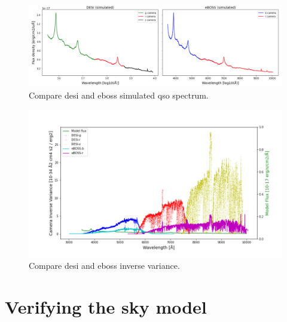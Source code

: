 
\begin{figure}[h]
\centering
\includegraphics[width=16cm]{images/specsim/sim_comparison.png}
\caption{Compare desi and eboss simulated qso spectrum.}
\label{fig:sim_comparison}
\end{figure}

\begin{figure}[h]
\centering
\includegraphics[width=16cm]{images/specsim/ivar_comparison.png}
\caption{Compare desi and eboss inverse variance.}
\label{fig:ivar_comparison}
\end{figure}

\section{Verifying the  sky model}


